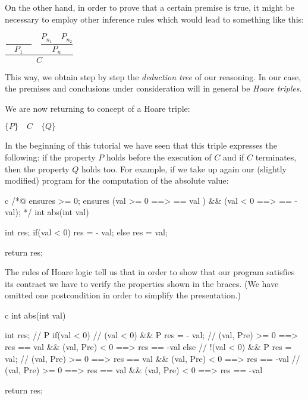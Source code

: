 On the other hand, in order to prove that a certain premise is true, it
might be necessary to employ other inference rules which would lead to
something like this:




\begin{center}
$\dfrac{\dfrac{}{\quad P_1\quad} \quad \dfrac{P_{n_1}\quad P_{n_2}}{P_n}}{C}$


\end{center}


This way, we obtain step by step the \emph{deduction tree} of our
reasoning. In our case, the premises and conclusions under consideration
will in general be \emph{Hoare triples}.





We are now returning to concept of a Hoare triple:




\begin{center}
$\{ P \}\quad  C\quad \{ Q \}$


\end{center}


In the beginning of this tutorial we have seen that this triple
expresses the following: if the property $P$ holds before the
execution of $C$ and if $C$ terminates, then the property $Q$
holds too. For example, if we take up again our (slightly modified)
program for the computation of the absolute value:



\begin{CodeBlock}{c}
/*@
  ensures \result >= 0;
  ensures (val >= 0 ==> \result == val ) && (val <  0 ==> \result == -val);
*/
int abs(int val){
  int res;
  if(val < 0) res = - val;
  else        res = val;

  return res;
}
\end{CodeBlock}



The rules of Hoare logic tell us that in order to show that our program
satisfies its contract we have to verify the properties shown in the
braces. (We have omitted one postcondition in order to simplify the
presentation.)



\begin{CodeBlock}{c}
int abs(int val){
  int res;
// { P }
  if(val < 0){
// {  (val < 0) && P }
    res = - val;
// { \at(val, Pre) >= 0 ==> res == val && \at(val, Pre) < 0 ==> res == -val }
  } else {
// { !(val < 0) && P }
    res = val;
// { \at(val, Pre) >= 0 ==> res == val && \at(val, Pre) < 0 ==> res == -val }
  }
// { \at(val, Pre) >= 0 ==> res == val && \at(val, Pre) < 0 ==> res == -val }

  return res;
}
\end{CodeBlock}



